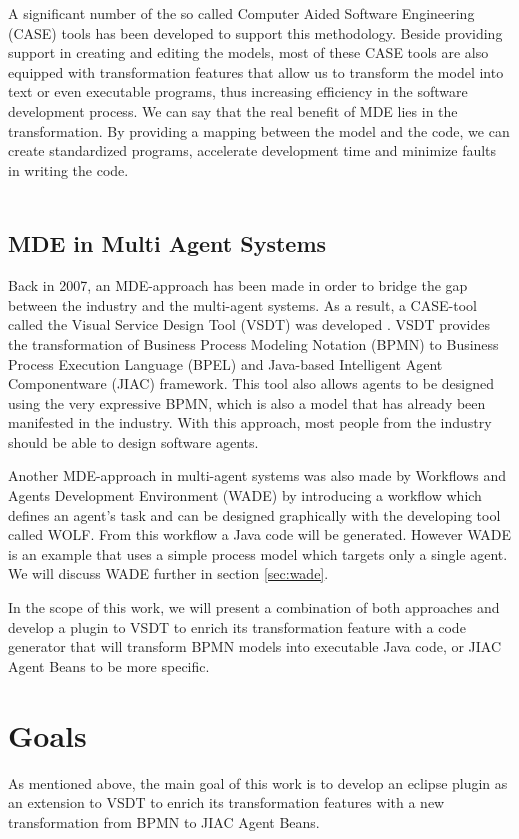 A significant number of the so called Computer Aided Software Engineering (CASE) tools has been developed to support this methodology. Beside providing support in creating and editing the models, most of these CASE tools are also equipped with transformation features that allow us to transform the model into text or even executable programs, thus increasing efficiency in the software development process. We can say that the real benefit of MDE lies in the transformation. By providing a mapping between the model and the code, we can create standardized programs, accelerate development time and minimize faults in writing the code. \\\\

\subsection{MDE in Multi Agent Systems} 
Back in 2007, an MDE-approach has been made in order to bridge the gap between the industry and the multi-agent systems. As a result, a CASE-tool called the Visual Service Design Tool (VSDT) was developed \cite{TK07}. VSDT provides the transformation of Business Process Modeling Notation (BPMN) to Business Process Execution Language (BPEL) and Java-based Intelligent Agent Componentware (JIAC) framework. This tool also allows agents to be designed using the very expressive BPMN, which is also a model that has already been manifested in the industry. With this approach, most people from the industry should be able to design software agents.

Another MDE-approach in multi-agent systems was also made by Workflows and Agents Development Environment (WADE) by introducing a workflow which defines an agent's task and can be designed graphically with the developing tool called WOLF. From this workflow a Java code will be generated. However WADE is an example that uses a simple process model which targets only a single agent. We will discuss WADE further in section \ref{sec:wade}.

In the scope of this work, we will present a combination of both approaches and develop a plugin to VSDT to enrich its transformation feature with a code generator that will transform BPMN models into executable Java code, or JIAC Agent Beans to be more specific.

\section{Goals}
\label{sec:Goals}
As mentioned above, the main goal of this work is to develop an eclipse plugin as an extension to VSDT to enrich its transformation features with a new transformation from BPMN to JIAC Agent Beans.

